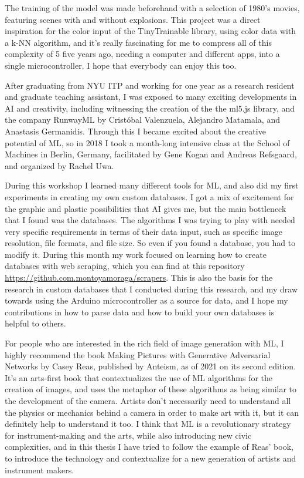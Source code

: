 The training of the model was made beforehand with a selection of 1980's movies, featuring scenes with and without explosions. This project was a direct inspiration for the color input of the TinyTrainable library, using color data with a \acrshort{k-NN} algorithm, and it's really fascinating for me to compress all of this complexity of 5 five years ago, needing a computer and different apps, into a single microcontroller. I hope that everybody can enjoy this too.

After graduating from \acrshort{NYU} \acrshort{ITP} and working for one year as a research resident and graduate teaching assistant, I was exposed to many exciting developments in \acrshort{AI} and creativity, including witnessing the creation of the the ml5.js library, and the company RunwayML by Cristóbal Valenzuela, Alejandro Matamala, and Anastasis Germanidis. Through this I became excited about the creative potential of \acrshort{ML}, so in 2018 I took a month-long intensive class at the School of Machines in Berlin, Germany, facilitated by Gene Kogan and Andreas Refsgaard, and organized by Rachel Uwa.

During this workshop I learned many different tools for \acrshort{ML}, and also did my first experiments in creating my own custom databases. I got a mix of excitement for the graphic and plastic possibilities that \acrshort{AI} gives me, but the main bottleneck that I found was the databases. The algorithms I was trying to play with needed very specific requirements in terms of their data input, such as specific image resolution, file formats,  and file size. So even if you found a database, you had to modify it. During this month my work focused on learning how to create databases with web scraping, which you can find at this repository \url{https://github.com.montoyamoraga/scrapers}. This is also the basis for the research in custom databases that I conducted during this research, and my draw towards using the Arduino microcontroller as a source for data, and I hope my contributions in how to parse data and how to build your own databases is helpful to others.

For people who are interested in the rich field of image generation with \acrshort{ML}, I highly recommend the book Making Pictures with Generative Adversarial Networks \cite{making-pictures-with-gans} by Casey Reas, published by Anteism, as of 2021 on its second edition. It’s an arts-first book that contextualizes the use of \acrshort{ML} algorithms for the creation of images, and uses the metaphor of these algorithms as being similar to the development of the camera. Artists don’t necessarily need to understand all the physics or mechanics behind a camera in order to make art with it, but it can definitely help to understand it too. I think that \acrshort{ML} is a revolutionary strategy for instrument-making and the arts, while also introducing new civic complexities, and in this thesis I have tried to follow the example of Reas' book, to introduce the technology and contextualize for a new generation of artists and instrument makers.
